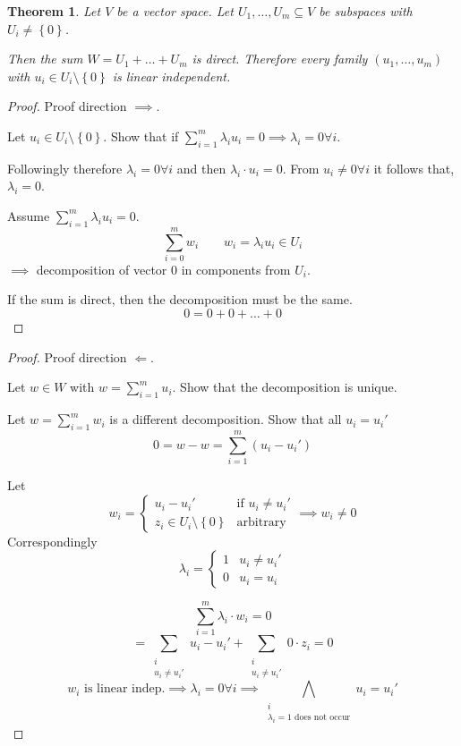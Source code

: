 \documentclass[a4paper,landscape,twocolumn]{article}
\newcommand\set[1]{\left\{#1\right\}}
\newtheorem{theorem}{Theorem}[section]
\begin{document}
\begin{theorem}
  \label{satz-4-14}
  Let $V$ be a vector space. Let $U_1, \dots, U_m \subseteq V$ be subspaces
  with $U_i \neq \set{0}$.

  Then the sum $W = U_1 + \dots + U_m$ is direct.
  Therefore every family $(u_1, \dots, u_m)$ with $u_i \in U_i \setminus \set{0}$ is linear independent.
\end{theorem}
\begin{proof}
  Proof direction $\implies$.

  Let $u_i \in U_i \setminus \set{0}$.
  Show that if $\sum_{i=1}^m \lambda_i u_i = 0 \implies \lambda_i = 0 \forall i$.

  Followingly therefore $\lambda_i = 0 \forall i$ and then $\lambda_i \cdot u_i = 0$.
  From $u_i \neq 0 \forall i$ it follows that, $\lambda_i = 0$.

  Assume $\sum_{i=1}^m \lambda_i u_i = 0$.
  \[ \sum_{i=0}^m w_i \qquad w_i = \lambda_i u_i \in U_i \]
  $\implies$ decomposition of vector $0$ in components from $U_i$.

  If the sum is direct, then the decomposition must be the same.
  \[ 0 = 0 + 0 + \dots + 0 \]
\end{proof}
\begin{proof}
  Proof direction $\Leftarrow$.

  Let $w \in W$ with $w = \sum_{i = 1}^m u_i$.
  Show that the decomposition is unique.

  Let $w = \sum_{i=1}^m w_i$ is a different decomposition.
  Show that all $u_i = u_i'$
  \[ 0 = w - w = \sum_{i=1}^m (u_i - u_i') \]

  Let
  \[
    w_i = \begin{cases}
      u_i - u_i' & \text{if } u_i \neq u_i' \\
      z_i \in U_i \setminus \set{0} & \text{arbitrary}
    \end{cases}
    \implies w_i \neq 0
  \]
  Correspondingly
  \[
    \lambda_i = \begin{cases}
      1 & u_i \neq u_i' \\
      0 & u_i = u_i
    \end{cases}
  \]

  \[ \sum_{i=1}^m \lambda_i \cdot w_i = 0 \]
  \[ = \sum_{\substack{i \\ u_i \neq u_i'}} u_i - u_i' + \sum_{\substack{i \\ u_i \neq u_i'}} 0 \cdot z_i = 0 \]
  \[ w_i \text{ is linear indep.} \implies \lambda_i = 0 \forall i \implies \bigwedge_{\substack{i \\ \lambda_i = 1 \text{ does not occur}}} u_i = u_i' \]
\end{proof}
\end{document}
